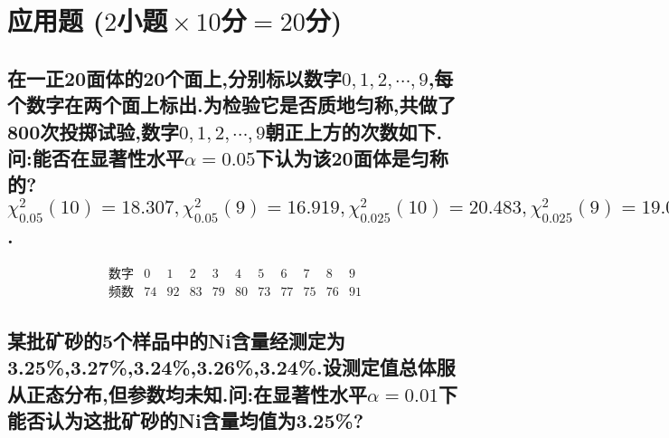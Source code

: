 \documentclass[UTF8]{article}
\begin{document}
    \section{应用题 \small($2\!\!$小题$\!\!\times 10\!\!$分$\!\!=\!\!20\!\!$分)}
    \subsection{
        在一正20面体的20个面上,分别标以数字$\!0,1,2,\cdots,9$,每个数字在两个面上标出.为检验它是否质地匀称,共做了800次投掷试验,数字$\!0,1,2,\cdots,9\!$朝正上方的次数如下.问:能否在显著性水平$\!\!\alpha=0.05\!\!$下认为该20面体是匀称的?\\ $\chi^2_{0.05}(10)=18.307,\chi^2_{0.05}(9)=16.919,\chi^2_{0.025}(10)=20.483,\chi^2_{0.025}(9)=19.023$.
    }
    $$\begin{array}{ccccccccccc}
        \textrm{数字}&0&1&2&3&4&5&6&7&8&9\\ 
        \textrm{频数}&74&92&83&79&80&73&77&75&76&91
    \end{array}$$
    \subsection{
        某批矿砂的5个样品中的Ni含量经测定为3.25\%,3.27\%,3.24\%,3.26\%,3.24\%.设测定值总体服从正态分布,但参数均未知.问:在显著性水平$\alpha=0.01$下能否认为这批矿砂的Ni含量均值为3.25\%?
    }
\end{document}

